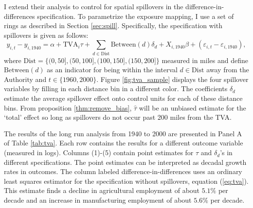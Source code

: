 \documentclass[11pt]{article}
\begin{document}
I extend their analysis to control for spatial spillovers in the difference-in-differences specification. To parametrize the exposure mapping, I use a set of rings as described in Section \ref{sec:spill}. Specifically, 
the specification with spillovers is given as follows:  
\begin{equation}\label{eq:tva_spillover}
    y_{i, t} - y_{i, 1940} = \alpha + \text{TVA}_i \tau + \sum_{d \in \text{Dist}} \text{Between}(d)\delta_d + X_{i, 1940} \beta + (\varepsilon_{i, t} - \varepsilon_{i, 1940}),
\end{equation} 
where $\text{Dist} = \{(0, 50], (50, 100], (100, 150], (150, 200]\}$ measured in miles and define $\text{Between}(d)$ as an indicator for being within the interval $d \in \text{Dist}$ away from the Authority and $t \in \{1960, 2000\}$. Figure \ref{fig:tva_sample} displays the four spillover variables by filling in each distance bin in a different color. The coefficients $\delta_d$ estimate the average spillover effect onto control units for each of these distance bins. From proposition \ref{thm:remove_bias}, $\hat{\tau}$ will be an unbiased estimate for the `total' effect so long as spillovers do not occur past 200 miles from the TVA.

The results of the long run analysis from 1940 to 2000 are presented in Panel A of Table \ref{tab:tva}. Each row contains the results for a different outcome variable (measured in logs). Columns (1)-(5) contain point estimates for $\tau$ and $\delta_d$'s in different specifications. The point estimates can be interpreted as decadal growth rates in outcomes. The column labeled difference-in-differences uses an ordinary least squares estimator for the specification without spillovers, equation (\ref{eq:tva}). This estimate finds a decline in agricultural employment of about $5.1\%$ per decade and an increase in manufacturing employment of about $5.6\%$ per decade. 
\end{document}
